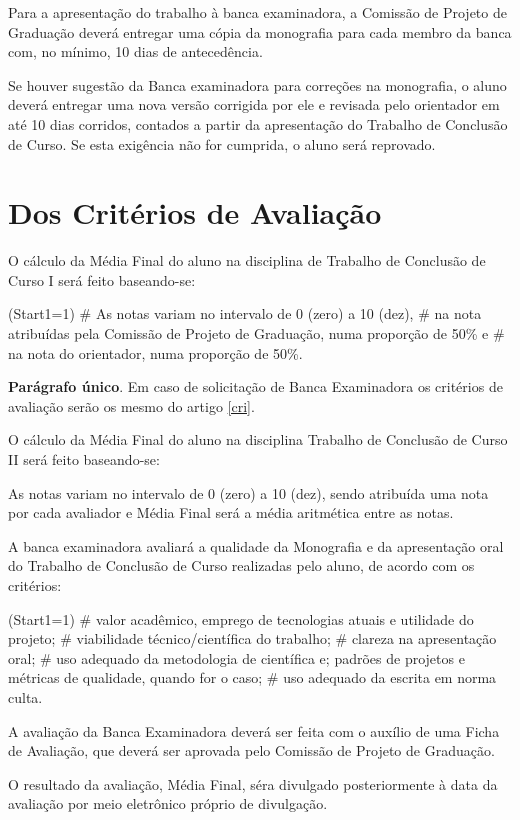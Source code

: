 \documentclass[12pt,geral,titlewithdate]{uftdocs}
\begin{document}
\artigo Para a apresentação do trabalho à banca examinadora, a Comissão de Projeto de Graduação deverá entregar uma cópia da monografia para cada membro da banca com, no mínimo, 10 dias de antecedência.

\artigo Se houver sugestão da Banca examinadora para correções na monografia, o aluno deverá entregar uma nova versão corrigida por ele e revisada pelo orientador em até 10 dias corridos, contados a partir da apresentação do Trabalho de Conclusão de Curso. Se esta exigência não for cumprida, o aluno será reprovado. 

\chapter{Dos Critérios de Avaliação}

\artigo O cálculo da Média Final do aluno na disciplina de Trabalho de Conclusão de Curso I será feito baseando-se:

\begin{easylist}\ListProperties(Start1=1)
# As notas variam no intervalo de 0 (zero) a 10 (dez),
# na nota atribuídas pela Comissão de Projeto de Graduação, numa proporção de 50\% e
# na nota do orientador, numa proporção de 50\%.
\end{easylist}

{\bf Parágrafo único}. Em caso de solicitação de Banca Examinadora os critérios de avaliação serão os mesmo do artigo \ref{cri}.
 
\artigo\label{cri} O cálculo da Média Final do aluno na disciplina Trabalho de Conclusão de Curso II será feito baseando-se:

\begin{paragrafos}
\paragrafo As notas variam no intervalo de 0 (zero) a 10 (dez), sendo atribuída uma nota por cada avaliador e Média Final será a média aritmética entre as notas.

\paragrafo A banca examinadora avaliará a qualidade da Monografia e da apresentação oral do Trabalho de Conclusão de Curso realizadas pelo aluno, de acordo com os critérios:

\begin{easylist}\ListProperties(Start1=1)
# valor acadêmico, emprego de tecnologias atuais e utilidade do projeto;
# viabilidade técnico/científica do trabalho;
# clareza na apresentação oral;
# uso adequado da metodologia de científica e; padrões de projetos e métricas de qualidade, quando for o caso;
# uso adequado da escrita em norma culta.
\end{easylist}

\paragrafo A avaliação da Banca Examinadora deverá ser feita com o auxílio de uma Ficha de Avaliação, que deverá ser aprovada pelo Comissão de Projeto de Graduação.

\paragrafo O resultado da avaliação, Média Final, séra divulgado posteriormente à data da avaliação por meio eletrônico próprio de divulgação.
 
\end{paragrafos}
\end{document}
